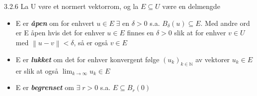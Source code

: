 \documentclass[a4paper,norsk]{article}
\begin{document}
\begin{definitionbox}{3.2.6}{}
La U vøre et normert vektorrom, og la $E \subseteq U $ være en delmengde
\begin{itemize}
    \item E er \textbf{\textit{åpen}} om for enhvert $ u \in E \; \exists $ en $ \delta > 0 $ s.a. $ B_{\delta} (u) \subseteq E $. Med andre ord er E åpen hvis det for enhver $ u \in E $ finnes en $ \delta > 0 $ slik at for enhver $ v \in U $ med $ \left\lVert u - v \right\rVert < \delta  $, så er også $ v \in  E $
    \item E er \textbf{\textit{lukket}} om det for enhver konvergent følge $ \left( u_k \right) _{k \in \mathbb{N}} $ av vektorer $ u_k \in E $  er slik at også $ \lim_{k \to \infty} u_k \in E $
    \item E er \textbf{\textit{begrenset}} om $ \exists  \; r > 0$  s.a. $ E \subseteq B_r(0) $ 
\end{itemize}
\end{definitionbox}
\end{document}
